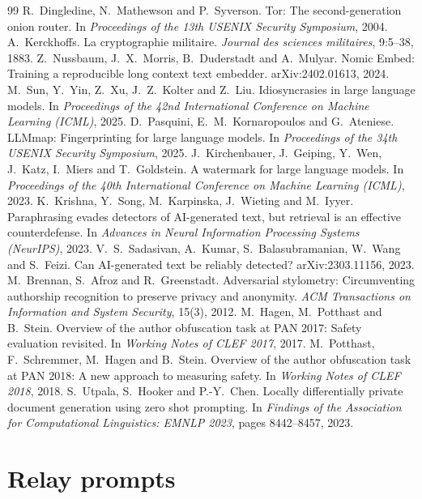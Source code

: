 \documentclass[11pt]{article}
\begin{document}
\begin{thebibliography}{99}
 R.~Dingledine, N.~Mathewson and P.~Syverson. Tor: The second-generation onion router. In \emph{Proceedings of the 13th USENIX Security Symposium}, 2004.
 A.~Kerckhoffs. La cryptographie militaire. \emph{Journal des sciences militaires}, 9:5--38, 1883.
 Z.~Nussbaum, J.~X.~Morris, B.~Duderstadt and A.~Mulyar. Nomic Embed: Training a reproducible long context text embedder. arXiv:2402.01613, 2024.
 M.~Sun, Y.~Yin, Z.~Xu, J.~Z.~Kolter and Z.~Liu. Idiosyncrasies in large language models. In \emph{Proceedings of the 42nd International Conference on Machine Learning (ICML)}, 2025.
 D.~Pasquini, E.~M.~Kornaropoulos and G.~Ateniese. LLMmap: Fingerprinting for large language models. In \emph{Proceedings of the 34th USENIX Security Symposium}, 2025.
 J.~Kirchenbauer, J.~Geiping, Y.~Wen, J.~Katz, I.~Miers and T.~Goldstein. A watermark for large language models. In \emph{Proceedings of the 40th International Conference on Machine Learning (ICML)}, 2023.
 K.~Krishna, Y.~Song, M.~Karpinska, J.~Wieting and M.~Iyyer. Paraphrasing evades detectors of AI-generated text, but retrieval is an effective counterdefense. In \emph{Advances in Neural Information Processing Systems (NeurIPS)}, 2023.
 V.~S.~Sadasivan, A.~Kumar, S.~Balasubramanian, W.~Wang and S.~Feizi. Can AI-generated text be reliably detected? arXiv:2303.11156, 2023.
 M.~Brennan, S.~Afroz and R.~Greenstadt. Adversarial stylometry: Circumventing authorship recognition to preserve privacy and anonymity. \emph{ACM Transactions on Information and System Security}, 15(3), 2012.
 M.~Hagen, M.~Potthast and B.~Stein. Overview of the author obfuscation task at PAN 2017: Safety evaluation revisited. In \emph{Working Notes of CLEF 2017}, 2017.
 M.~Potthast, F.~Schremmer, M.~Hagen and B.~Stein. Overview of the author obfuscation task at PAN 2018: A new approach to measuring safety. In \emph{Working Notes of CLEF 2018}, 2018.
 S.~Utpala, S.~Hooker and P.-Y.~Chen. Locally differentially private document generation using zero shot prompting. In \emph{Findings of the Association for Computational Linguistics: EMNLP 2023}, pages 8442--8457, 2023.
\end{thebibliography}

\appendix
\section{Relay prompts}
\label{app:prompts}
\end{document}
